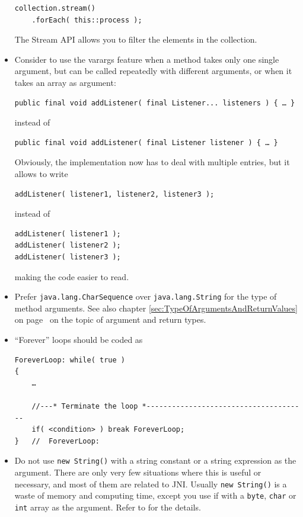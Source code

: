 \documentclass[11pt,a4paper, titlepage, parskip=half, headsepline, footsepline, cleardoublepage=current, headheight=1cm]{scrbook}
\newcommand*{\tqvref}[1]{\hyperref[{#1}]{\ref*{#1}} on page~\pageref{#1}}
\begin{document}
\begin{itemize}
{\begin{lstlisting}
collection.stream()
    .forEach( this::process );
\end{lstlisting}

The Stream API allows you to filter the elements in the collection.}

\item{Consider to use the varargs feature when a method takes only one single argument, but can be called repeatedly with different arguments, or when it takes an array as argument:

\begin{lstlisting}
public final void addListener( final Listener... listeners ) { … }
\end{lstlisting}

instead of
\begin{lstlisting}
public final void addListener( final Listener listener ) { … }
\end{lstlisting}

Obviously, the implementation now has to deal with multiple entries, but it allows to write
\begin{lstlisting}
addListener( listener1, listener2, listener3 );
\end{lstlisting}
instead of
\begin{lstlisting}
addListener( listener1 );
addListener( listener2 );
addListener( listener3 );
\end{lstlisting}
making the code easier to read.}

\item{Prefer \lstinline|java.lang.CharSequence|\autocite{ORACLE_DOC_CHARSEQUENCE_INTERFACE} over \lstinline|java.lang.String| for the type of method arguments. See also chapter \tqvref{sec:TypeOfArgumentsAndReturnValues} on the topic of argument and return types.}

\item{“Forever” loops should be coded as
\begin{lstlisting}
ForeverLoop: while( true ) 
{ 
    … 
    
    //---* Terminate the loop *--------------------------------------
    if( <condition> ) break ForeverLoop;
}   //  ForeverLoop:
\end{lstlisting} }

\item{Do not use \lstinline|new String()| with a string constant or a string expression as the argument. There are only very few situations where this is useful or necessary, and most of them are related to JNI. Usually \lstinline|new String()| is a waste of memory and computing time, except you use if with a \lstinline|byte|, \lstinline|char| or \lstinline|int| array as the argument. Refer to \autocite{ORACLE_DOC_STRING_CLASS} for the details.}


\end{itemize}
\end{document}

